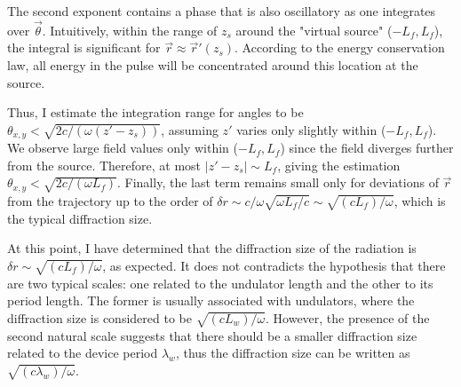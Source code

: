     The second exponent contains a phase that is also oscillatory as one integrates over $\vec{\theta}$. Intuitively, within the range of $z_s$ around the "virtual source" ($-L_f, L_f$), the integral is significant for $\vec{r} \approx \vec{r}'(z_s)$. According to the energy conservation law, all energy in the pulse will be concentrated around this location at the source.
    
    Thus, I estimate the integration range for angles to be $\theta_{x, y} < \sqrt{2c/(\omega (z' - z_s))}$, assuming $z'$ varies only slightly within ($-L_f, L_f$). We observe large field values only within ($-L_f, L_f$) since the field diverges further from the source. Therefore, at most $|z' - z_s| \sim L_f$, giving the estimation $\theta_{x, y} < \sqrt{2c/(\omega L_f)}$. Finally, the last term remains small only for deviations of $\vec{r}$ from the trajectory up to the order of $\delta r \sim c / \omega \sqrt{\omega L_f / c} \sim \sqrt{(cL_f)/\omega}$, which is the typical diffraction size.

    At this point, I have determined that the diffraction size of the radiation is $\delta r \sim \sqrt{(cL_f)/\omega}$, as expected. It does not contradicts the hypothesis that there are two typical scales: one related to the undulator length and the other to its period length. The former is usually associated with undulators, where the diffraction size is considered to be $\sqrt{(cL_w)/\omega}$. However, the presence of the second natural scale suggests that there should be a smaller diffraction size related to the device period $\lambda_w$, thus the diffraction size can be written as $\sqrt{(c\lambda_w)/\omega}$. 
    
